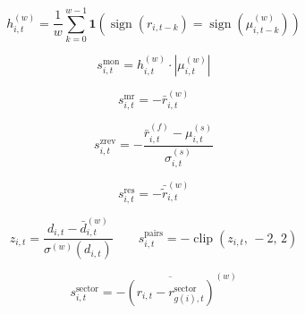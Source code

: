 


\begin{equation}
h^{(w)}_{i,t} = \frac{1}{w} \sum_{k=0}^{w-1} \mathbf{1}\left(\operatorname{sign}(r_{i,t-k}) = \operatorname{sign}(\mu^{(w)}_{i,t-k})\right)
\end{equation}

\begin{equation}
s^{\mathrm{mon}}_{i,t} = h^{(w)}_{i,t} \cdot \left|\mu^{(w)}_{i,t}\right|
\end{equation}


\begin{equation}
s^{\mathrm{mr}}_{i,t} = -\bar{r}^{(w)}_{i,t}
\end{equation}


\begin{equation}
s^{\mathrm{zrev}}_{i,t} = -\frac{\bar{r}^{(f)}_{i,t} - \mu^{(s)}_{i,t}}{\sigma^{(s)}_{i,t}}
\end{equation}


\begin{equation}
s^{\mathrm{res}}_{i,t} = -\bar{\tilde{r}}^{(w)}_{i,t}
\end{equation}


\begin{equation}
z_{i,t} = \frac{d_{i,t} - \bar{d}^{(w)}_{i,t}}{\sigma^{(w)}(d_{i,t})} \qquad s^{\text{pairs}}_{i,t} = -\operatorname{clip}(z_{i,t},\, -2,\, 2)
\end{equation}


\begin{equation}
s^{\text{sector}}_{i,t} = -\overline{(r_{i,t} - r^{\text{sector}}_{g(i),t})}^{(w)}
\end{equation}


